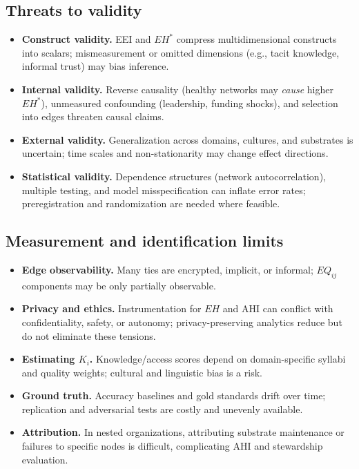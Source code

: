 \documentclass[12pt]{article}
\begin{document}
\subsection{Threats to validity}
\begin{itemize}[leftmargin=1.2em]
\item \textbf{Construct validity.} EEI and $EH^{\ast}$ compress multidimensional constructs into scalars; mismeasurement or omitted dimensions (e.g., tacit knowledge, informal trust) may bias inference.
\item \textbf{Internal validity.} Reverse causality (healthy networks may \emph{cause} higher $EH^{\ast}$), unmeasured confounding (leadership, funding shocks), and selection into edges threaten causal claims.
\item \textbf{External validity.} Generalization across domains, cultures, and substrates is uncertain; time scales and non-stationarity may change effect directions.
\item \textbf{Statistical validity.} Dependence structures (network autocorrelation), multiple testing, and model misspecification can inflate error rates; preregistration and randomization are needed where feasible.
\end{itemize}

\subsection{Measurement and identification limits}
\begin{itemize}[leftmargin=1.2em]
\item \textbf{Edge observability.} Many ties are encrypted, implicit, or informal; $EQ_{ij}$ components may be only partially observable.
\item \textbf{Privacy and ethics.} Instrumentation for $EH$ and AHI can conflict with confidentiality, safety, or autonomy; privacy-preserving analytics reduce but do not eliminate these tensions.
\item \textbf{Estimating $K_i$.} Knowledge/access scores depend on domain-specific syllabi and quality weights; cultural and linguistic bias is a risk.
\item \textbf{Ground truth.} Accuracy baselines and gold standards drift over time; replication and adversarial tests are costly and unevenly available.
\item \textbf{Attribution.} In nested organizations, attributing substrate maintenance or failures to specific nodes is difficult, complicating AHI and stewardship evaluation.
\end{itemize}
\end{document}
